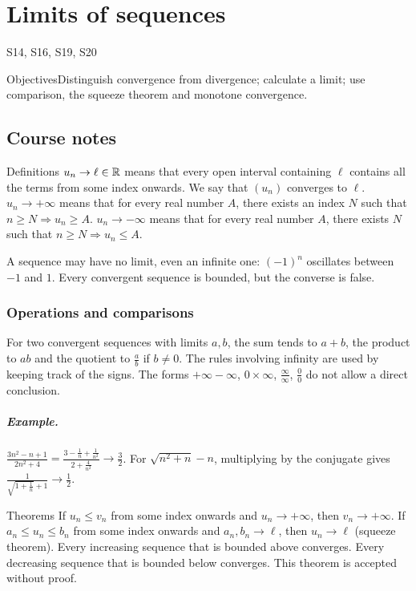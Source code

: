 \setcounter{chapter}{1}\chapter{Limits of sequences}\label{ch:2}

{\small\sffamily\color{teal}S14, S16, S19, S20\par}

\begin{retenir}{Objectives}Distinguish convergence from divergence; calculate a limit; use comparison, the squeeze theorem and monotone convergence.\end{retenir}

\section{Course notes}
\begin{retenir}{Definitions}
$u_n\to\ell\in\mathbb R$ means that every open interval containing $\ell$ contains all the terms from some index onwards. We say that $(u_n)$ converges to $\ell$.
$u_n\to+\infty$ means that for every real number $A$, there exists an index $N$ such that $n\ge N\Rightarrow u_n\ge A$. $u_n\to-\infty$ means that for every real number $A$, there exists $N$ such that $n\ge N\Rightarrow u_n\le A$.
\end{retenir}
A sequence may have no limit, even an infinite one: $(-1)^n$ oscillates between $-1$ and $1$. Every convergent sequence is bounded, but the converse is false.
\subsection{Operations and comparisons}
For two convergent sequences with limits $a,b$, the sum tends to $a+b$, the product to $ab$ and the quotient to $\frac{a}{b}$ if $b\ne0$. The rules involving infinity are used by keeping track of the signs. The forms $+\infty-\infty$, $0\times\infty$, $\frac{\infty}{\infty}$, $\frac{0}{0}$ do not allow a direct conclusion.
\paragraph{Example.} $\frac{3n^2-n+1}{2n^2+4}=\frac{3-\frac{1}{n}+\frac{1}{n^2}}{2+\frac{4}{n^2}}\to\frac{3}{2}$. For $\sqrt{n^2+n}-n$, multiplying by the conjugate gives $\frac{1}{\sqrt{1+\frac{1}{n}}+1}\to\frac{1}{2}$.
\begin{retenir}{Theorems}
If $u_n\le v_n$ from some index onwards and $u_n\to+\infty$, then $v_n\to+\infty$. If $a_n\le u_n\le b_n$ from some index onwards and $a_n,b_n\to\ell$, then $u_n\to\ell$ (squeeze theorem).
Every increasing sequence that is bounded above converges. Every decreasing sequence that is bounded below converges. This theorem is accepted without proof.
\end{retenir}
